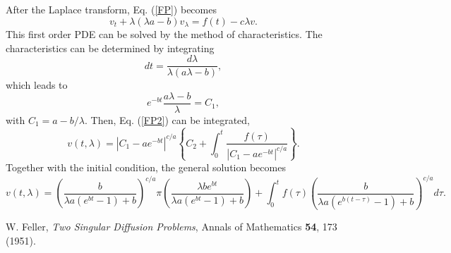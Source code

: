 \documentclass[12pt]{article}
\begin{document}
  After the Laplace transform, Eq. (\ref{FP}) becomes
  \begin{equation}
    v_t + \lambda(\lambda a - b) v_{\lambda} = f(t) - c\lambda v.
    \label{FP2}
  \end{equation}
  This first order PDE can be solved by the method of characteristics. The characteristics can be determined by integrating
  \begin{equation}
    dt = \frac{d\lambda}{\lambda(a\lambda - b)},
  \end{equation}
  which leads to 
  \begin{equation}
    e^{-bt}\frac{a\lambda - b}{\lambda} = C_1,
  \end{equation}
  with $C_1 = a - b/\lambda$. Then, Eq. (\ref{FP2}) can be integrated, 
  \begin{equation}
    v(t,\lambda) = \left|C_1-ae^{-bt}\right|^{c/a}\left\{C_2+\int_0^t\frac{f(\tau)}{\left|C_1-ae^{-bt}\right|^{c/a}}\right\}.
  \end{equation}
  Together with the initial condition, the general solution becomes
  \begin{equation}
    v(t,\lambda)=\left(\frac{b}{\lambda a(e^{bt}-1)+b}\right)^{c/a}\pi\left(\frac{\lambda be^{bt}}{\lambda a(e^{bt}-1)+b}\right)
                    +\int_0^tf(\tau)\left(\frac{b}{\lambda a(e^{b(t-\tau)}-1)+b}\right)^{c/a}d\tau.
  \end{equation}


\begin{thebibliography}{99}
    W. Feller, {\it Two Singular Diffusion Problems}, Annals of Mathematics {\bf 54}, 173 (1951).

\end{thebibliography}
\end{document}
